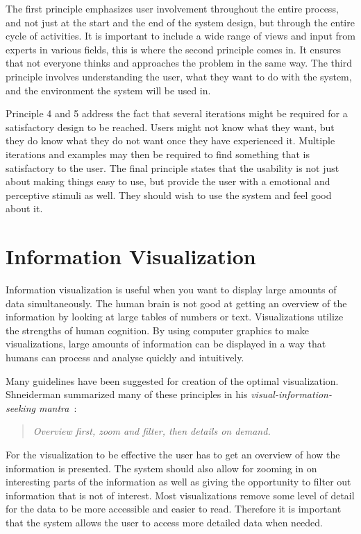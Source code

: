The first principle emphasizes user involvement throughout the entire process, and not just at the start and the end of the system design, but through the entire cycle of activities. It is important to include a wide range of views and input from experts in various fields, this is where the second principle comes in. It ensures that not everyone thinks and approaches the problem in the same way. The third principle involves understanding the user, what they want to do with the system, and the environment the system will be used in.

Principle 4 and 5 address the fact that several iterations might be required for a satisfactory design to be reached. Users might not know what they want, but they do know what they do not want once they have experienced it. Multiple iterations and examples may then be required to find something that is satisfactory to the user. The final principle states that the usability is not just about making things easy to use, but provide the user with a emotional and perceptive stimuli as well. They should wish to use the system and feel good about it.

\section{Information Visualization}
Information visualization is useful when you want to display large amounts of data simultaneously. The human brain is not good at getting an overview of the information by looking at large tables of numbers or text. Visualizations utilize the strengths of human cognition. By using computer graphics to make visualizations, large amounts of information can be displayed in a way that humans can process and analyse quickly and intuitively.

Many guidelines have been suggested for creation of the optimal visualization. Shneiderman summarized many of these principles in his \emph{visual-information-seeking mantra}~\cite{shneiderman}:

\vspace{-13pt}
\begin{quote}
\textit{Overview first, zoom and filter, then details on demand.}
\end{quote}

For the visualization to be effective the user has to get an overview of how the information is presented. The system should also allow for zooming in on interesting parts of the information as well as giving the opportunity to filter out information that is not of interest. Most visualizations remove some level of detail for the data to be more accessible and easier to read. Therefore it is important that the system allows the user to access more detailed data when needed.

